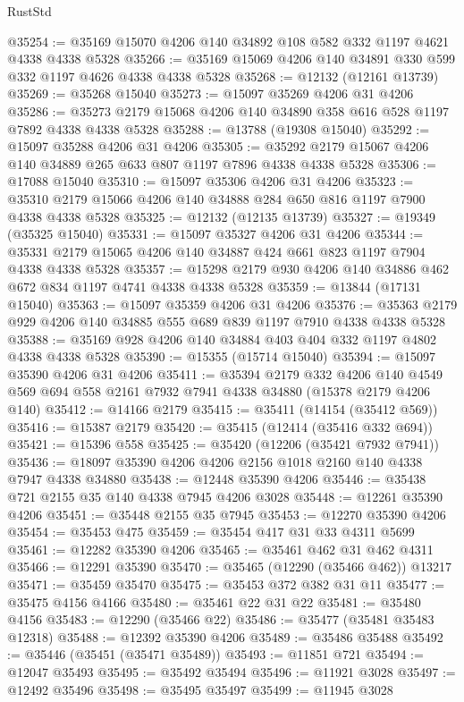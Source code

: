 \begin{lexlean}{RustStd}
\begin{coremodule}
{\begin{coremodule}
{{{{{{{{{{{{{{{{{{{{{{{{{{{{{{{{{{{{{{{{{{{{{{{{{{@35254 := @35169 @15070 @4206 @140 @34892 @108 @582 @332 @1197 @4621 @4338 @4338 @5328
@35266 := @35169 @15069 @4206 @140 @34891 @330 @599 @332 @1197 @4626 @4338 @4338 @5328
@35268 := @12132 (@12161 @13739)
@35269 := @35268 @15040
@35273 := @15097 @35269 @4206 @31 @4206
@35286 := @35273 @2179 @15068 @4206 @140 @34890 @358 @616 @528 @1197 @7892 @4338 @4338 @5328
@35288 := @13788 (@19308 @15040)
@35292 := @15097 @35288 @4206 @31 @4206
@35305 := @35292 @2179 @15067 @4206 @140 @34889 @265 @633 @807 @1197 @7896 @4338 @4338 @5328
@35306 := @17088 @15040
@35310 := @15097 @35306 @4206 @31 @4206
@35323 := @35310 @2179 @15066 @4206 @140 @34888 @284 @650 @816 @1197 @7900 @4338 @4338 @5328
@35325 := @12132 (@12135 @13739)
@35327 := @19349 (@35325 @15040)
@35331 := @15097 @35327 @4206 @31 @4206
@35344 := @35331 @2179 @15065 @4206 @140 @34887 @424 @661 @823 @1197 @7904 @4338 @4338 @5328
@35357 := @15298 @2179 @930 @4206 @140 @34886 @462 @672 @834 @1197 @4741 @4338 @4338 @5328
@35359 := @13844 (@17131 @15040)
@35363 := @15097 @35359 @4206 @31 @4206
@35376 := @35363 @2179 @929 @4206 @140 @34885 @555 @689 @839 @1197 @7910 @4338 @4338 @5328
@35388 := @35169 @928 @4206 @140 @34884 @403 @404 @332 @1197 @4802 @4338 @4338 @5328
@35390 := @15355 (@15714 @15040)
@35394 := @15097 @35390 @4206 @31 @4206
@35411 := @35394
    @2179
    @332
    @4206
    @140
    @4549
    @569
    @694
    @558
    @2161
    @7932
    @7941
    @4338
    @34880
    (@15378 @2179 @4206 @140)
@35412 := @14166 @2179
@35415 := @35411 (@14154 (@35412 @569))
@35416 := @15387 @2179
@35420 := @35415 (@12414 (@35416 @332 @694))
@35421 := @15396 @558
@35425 := @35420 (@12206 (@35421 @7932 @7941))
@35436 := @18097 @35390 @4206 @4206 @2156 @1018 @2160 @140 @4338 @7947 @4338 @34880
@35438 := @12448 @35390 @4206
@35446 := @35438 @721 @2155 @35 @140 @4338 @7945 @4206 @3028
@35448 := @12261 @35390 @4206
@35451 := @35448 @2155 @35 @7945
@35453 := @12270 @35390 @4206
@35454 := @35453 @475
@35459 := @35454 @417 @31 @33 @4311 @5699
@35461 := @12282 @35390 @4206
@35465 := @35461 @462 @31 @462 @4311
@35466 := @12291 @35390
@35470 := @35465 (@12290 (@35466 @462)) @13217
@35471 := @35459 @35470
@35475 := @35453 @372 @382 @31 @11
@35477 := @35475 @4156 @4166
@35480 := @35461 @22 @31 @22
@35481 := @35480 @4156
@35483 := @12290 (@35466 @22)
@35486 := @35477 (@35481 @35483 @12318)
@35488 := @12392 @35390 @4206
@35489 := @35486 @35488
@35492 := @35446 (@35451 (@35471 @35489))
@35493 := @11851 @721
@35494 := @12047 @35493
@35495 := @35492 @35494
@35496 := @11921 @3028
@35497 := @12492 @35496
@35498 := @35495 @35497
@35499 := @11945 @3028
}}}}}}}}}}}}}}}}}}}}}}}}}}}}}}}}}}}}}}}}}}}}}}}}}}
\end{coremodule}}
\end{coremodule}
\end{lexlean}
